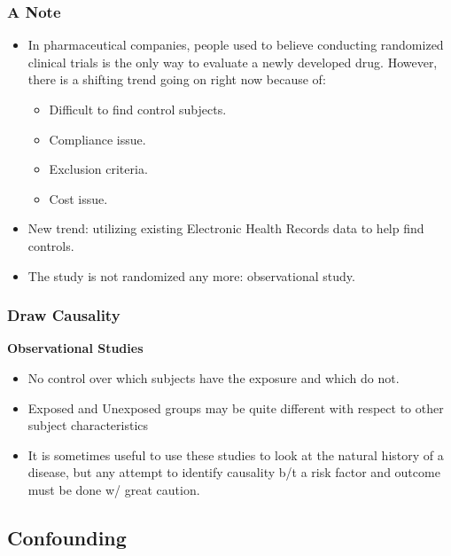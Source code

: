 \subsubsection*{A Note}
\begin{itemize}
    \item In pharmaceutical companies, people used to believe
          conducting randomized clinical trials is the only way to
          evaluate a newly developed drug. However, there is a shifting
          trend going on right now because of:
          \begin{itemize}
              \item Difficult to find control subjects.
              \item Compliance issue.
              \item Exclusion criteria.
              \item Cost issue.
          \end{itemize}
    \item New trend: utilizing existing Electronic Health Records data
          to help find controls.
    \item The study is not randomized any more: observational study.
\end{itemize}
\subsubsection*{Draw Causality}
\textbf{Observational Studies}
\begin{itemize}
    \item No control over which subjects have the exposure and which
          do not.
    \item Exposed and Unexposed groups may be quite different with
          respect to other subject characteristics
    \item It is sometimes useful to use these studies to look at the
          natural history of a disease, but any attempt to identify
          causality b/t a risk factor and outcome must be done w/
          great caution.
\end{itemize}
\subsection{Confounding}
